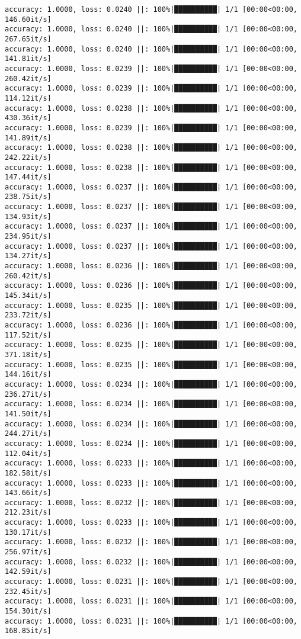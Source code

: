 \documentclass[
]{article}
\begin{document}
\begin{verbatim}
accuracy: 1.0000, loss: 0.0240 ||: 100%|██████████| 1/1 [00:00<00:00, 146.60it/s]
accuracy: 1.0000, loss: 0.0240 ||: 100%|██████████| 1/1 [00:00<00:00, 267.65it/s]
accuracy: 1.0000, loss: 0.0240 ||: 100%|██████████| 1/1 [00:00<00:00, 141.81it/s]
accuracy: 1.0000, loss: 0.0239 ||: 100%|██████████| 1/1 [00:00<00:00, 260.42it/s]
accuracy: 1.0000, loss: 0.0239 ||: 100%|██████████| 1/1 [00:00<00:00, 114.12it/s]
accuracy: 1.0000, loss: 0.0238 ||: 100%|██████████| 1/1 [00:00<00:00, 430.36it/s]
accuracy: 1.0000, loss: 0.0239 ||: 100%|██████████| 1/1 [00:00<00:00, 141.89it/s]
accuracy: 1.0000, loss: 0.0238 ||: 100%|██████████| 1/1 [00:00<00:00, 242.22it/s]
accuracy: 1.0000, loss: 0.0238 ||: 100%|██████████| 1/1 [00:00<00:00, 147.44it/s]
accuracy: 1.0000, loss: 0.0237 ||: 100%|██████████| 1/1 [00:00<00:00, 238.75it/s]
accuracy: 1.0000, loss: 0.0237 ||: 100%|██████████| 1/1 [00:00<00:00, 134.93it/s]
accuracy: 1.0000, loss: 0.0237 ||: 100%|██████████| 1/1 [00:00<00:00, 234.95it/s]
accuracy: 1.0000, loss: 0.0237 ||: 100%|██████████| 1/1 [00:00<00:00, 134.27it/s]
accuracy: 1.0000, loss: 0.0236 ||: 100%|██████████| 1/1 [00:00<00:00, 260.42it/s]
accuracy: 1.0000, loss: 0.0236 ||: 100%|██████████| 1/1 [00:00<00:00, 145.34it/s]
accuracy: 1.0000, loss: 0.0235 ||: 100%|██████████| 1/1 [00:00<00:00, 233.72it/s]
accuracy: 1.0000, loss: 0.0236 ||: 100%|██████████| 1/1 [00:00<00:00, 117.52it/s]
accuracy: 1.0000, loss: 0.0235 ||: 100%|██████████| 1/1 [00:00<00:00, 371.18it/s]
accuracy: 1.0000, loss: 0.0235 ||: 100%|██████████| 1/1 [00:00<00:00, 144.16it/s]
accuracy: 1.0000, loss: 0.0234 ||: 100%|██████████| 1/1 [00:00<00:00, 236.27it/s]
accuracy: 1.0000, loss: 0.0234 ||: 100%|██████████| 1/1 [00:00<00:00, 141.50it/s]
accuracy: 1.0000, loss: 0.0234 ||: 100%|██████████| 1/1 [00:00<00:00, 244.27it/s]
accuracy: 1.0000, loss: 0.0234 ||: 100%|██████████| 1/1 [00:00<00:00, 112.04it/s]
accuracy: 1.0000, loss: 0.0233 ||: 100%|██████████| 1/1 [00:00<00:00, 182.58it/s]
accuracy: 1.0000, loss: 0.0233 ||: 100%|██████████| 1/1 [00:00<00:00, 143.66it/s]
accuracy: 1.0000, loss: 0.0232 ||: 100%|██████████| 1/1 [00:00<00:00, 212.23it/s]
accuracy: 1.0000, loss: 0.0233 ||: 100%|██████████| 1/1 [00:00<00:00, 130.17it/s]
accuracy: 1.0000, loss: 0.0232 ||: 100%|██████████| 1/1 [00:00<00:00, 256.97it/s]
accuracy: 1.0000, loss: 0.0232 ||: 100%|██████████| 1/1 [00:00<00:00, 142.59it/s]
accuracy: 1.0000, loss: 0.0231 ||: 100%|██████████| 1/1 [00:00<00:00, 232.45it/s]
accuracy: 1.0000, loss: 0.0231 ||: 100%|██████████| 1/1 [00:00<00:00, 154.30it/s]
accuracy: 1.0000, loss: 0.0231 ||: 100%|██████████| 1/1 [00:00<00:00, 168.85it/s]

\end{verbatim}
\end{document}
